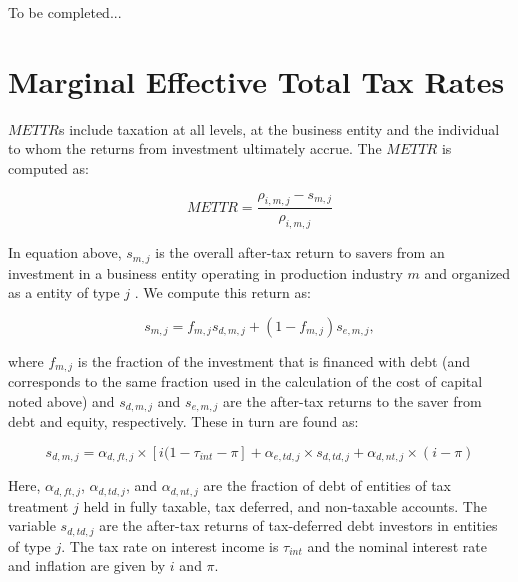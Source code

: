 \documentclass[article,11pt,letterpaper,fleqn]{article}
\theoremstyle{definition}
\numberwithin{equation}{section}
\begin{document}
To be completed...


\section{Marginal Effective Total Tax Rates}
\label{sec:METTR}

$METTR$s include taxation at all levels, at the business entity and the individual to whom the returns from investment ultimately accrue.  The $METTR$ is computed as:


\begin{equation}
METTR = \frac{\rho_{i,m,j}-s_{m,j}}{\rho_{i,m,j}}
\end{equation}

\noindent\noindent In equation above, $s_{m,j}$ is the overall after-tax return to savers from an investment in a business entity operating in production industry $m$ and organized as a entity of type $j$ .  We compute this return as:

\begin{equation}
s_{m,j} = f_{m,j}s_{d,m,j} + (1-f_{m,j})s_{e,m,j},
\end{equation}

\noindent\noindent where $f_{m,j}$ is the fraction of the investment that is financed with debt (and corresponds to the same fraction used in the calculation of the cost of capital noted above) and $s_{d,m,j}$ and $s_{e,m,j}$ are the after-tax returns to the saver from debt and equity, respectively.  These in turn are found as:

\begin{equation}
s_{d,m,j} = \alpha_{d,ft,j}\times \left[i(1-\tau_{int}-\pi\right] + \alpha_{e,td,j}\times s_{d,td,j} + \alpha_{d,nt,j}\times (i-\pi)
\end{equation}

Here, $\alpha_{d,ft,j}$, $\alpha_{d,td,j}$, and $\alpha_{d,nt,j}$ are the fraction of debt of entities of tax treatment $j$ held in fully taxable, tax deferred, and non-taxable accounts.  The variable $s_{d,td,j}$ are the after-tax returns of tax-deferred debt investors in entities of type $j$.  The tax rate on interest income is $\tau_{int}$ and the nominal interest rate and inflation are given by $i$ and $\pi$.
\end{document}
